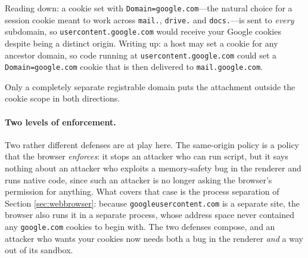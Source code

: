 Reading down: a cookie set with \texttt{Domain=google.com}---the natural
choice for a session cookie meant to work across \texttt{mail.},
\texttt{drive.} and \texttt{docs.}---is sent to \emph{every} subdomain,
so \texttt{usercontent.google.com} would receive your Google cookies
despite being a distinct origin.
Writing up: a host may set a cookie for any ancestor domain, so code
running at \texttt{usercontent.google.com} could set a
\texttt{Domain=google.com} cookie that is then delivered to
\texttt{mail.google.com}.

Only a completely separate registrable domain puts the attachment
outside the cookie scope in both directions.

\paragraph{Two levels of enforcement.}
Two rather different defenses are at play here.
The same-origin policy is a policy that the browser \emph{enforces}: it
stops an attacker who can run script, but it says nothing about an
attacker who exploits a memory-safety bug in the renderer and runs
native code, since such an attacker is no longer asking the browser's
permission for anything.
What covers that case is the process separation of
Section \ref{sec:webbrowser}: because \texttt{googleusercontent.com} is a
separate site, the browser also runs it in a separate process, whose
address space never contained any \texttt{google.com} cookies to begin
with.
The two defenses compose, and an attacker who wants your cookies now
needs both a bug in the renderer \emph{and} a way out of its
sandbox.

